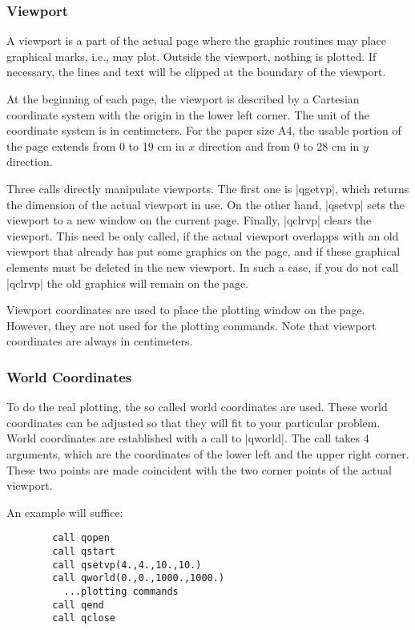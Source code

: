 \documentclass{article}
\begin{document}
\subsubsection{Viewport}

A viewport is a part of the actual page where the graphic routines may
place graphical marks, i.e., may plot. Outside the viewport,
nothing is plotted. If necessary, the lines and text will be clipped at
the boundary of the viewport.

At the beginning of each page, the viewport is described by a Cartesian
coordinate system with the origin in the lower left corner. The unit of
the coordinate system is in centimeters. For the paper size A4, the
usable portion of the page extends from 0 to 19 cm in $x$ direction and
from 0 to 28 cm in $y$ direction.

Three calls directly manipulate viewports. The first one is |qgetvp|,
which returns the dimension of the actual viewport in use.  On the
other hand, |qsetvp| sets the viewport to a new window on the current
page. Finally, |qclrvp| clears the viewport. This need be only called,
if the actual viewport overlapps with an old viewport that already has
put some graphics on the page, and if these graphical elements must be
deleted in the new viewport. In such a case, if you do not call
|qclrvp| the old graphics will remain on the page.

Viewport coordinates are used to place the plotting window on the
page.  However, they are not used for the plotting commands.  Note that
viewport coordinates are always in centimeters.


\subsubsection{World Coordinates}

To do the real plotting, the so called world coordinates are used.
These world coordinates can be adjusted so that they will fit to your
particular problem. World coordinates are established with a call to
|qworld|. The call takes 4 arguments, which are the coordinates of the
lower left and the upper right corner. These two points are made
coincident with the two corner points of the actual viewport.

An example will suffice:

\begin{verbatim}
        call qopen
        call qstart
        call qsetvp(4.,4.,10.,10.)
        call qworld(0.,0.,1000.,1000.)
          ...plotting commands
        call qend
        call qclose
\end{verbatim}
\end{document}
